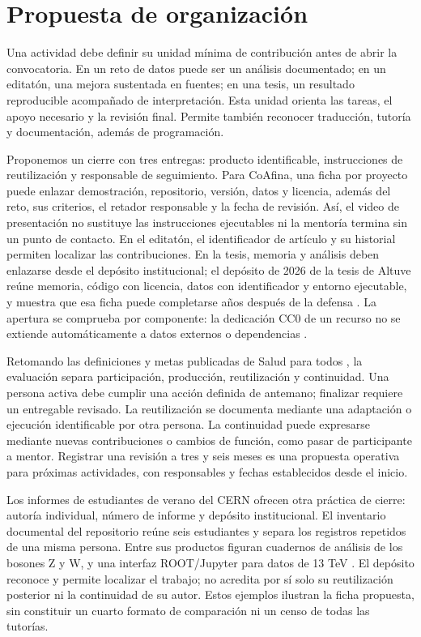\section{Propuesta de organización}
Una actividad debe definir su unidad mínima de contribución antes de abrir la convocatoria. En un reto de datos puede ser un análisis documentado; en un editatón, una mejora sustentada en fuentes; en una tesis, un resultado reproducible acompañado de interpretación. Esta unidad orienta las tareas, el apoyo necesario y la revisión final. Permite también reconocer traducción, tutoría y documentación, además de programación.

Proponemos un cierre con tres entregas: producto identificable, instrucciones de reutilización y responsable de seguimiento. Para CoAfina, una ficha por proyecto puede enlazar demostración, repositorio, versión, datos y licencia, además del reto, sus criterios, el retador responsable y la fecha de revisión. Así, el video de presentación no sustituye las instrucciones ejecutables ni la mentoría termina sin un punto de contacto. En el editatón, el identificador de artículo y su historial permiten localizar las contribuciones. En la tesis, memoria y análisis deben enlazarse desde el depósito institucional; el depósito de 2026 de la tesis de Altuve reúne memoria, código con licencia, datos con identificador y entorno ejecutable, y muestra que esa ficha puede completarse años después de la defensa \cite{tesisaltuve}. La apertura se comprueba por componente: la dedicación CC0 de un recurso no se extiende automáticamente a datos externos o dependencias \cite{cc0}.

Retomando las definiciones y metas publicadas de Salud para todos \cite{salud}, la evaluación separa participación, producción, reutilización y continuidad. Una persona activa debe cumplir una acción definida de antemano; finalizar requiere un entregable revisado. La reutilización se documenta mediante una adaptación o ejecución identificable por otra persona. La continuidad puede expresarse mediante nuevas contribuciones o cambios de función, como pasar de participante a mentor. Registrar una revisión a tres y seis meses es una propuesta operativa para próximas actividades, con responsables y fechas establecidos desde el inicio.

Los informes de estudiantes de verano del CERN ofrecen otra práctica de cierre: autoría individual, número de informe y depósito institucional. El inventario documental del repositorio reúne seis estudiantes y separa los registros repetidos de una misma persona. Entre sus productos figuran cuadernos de análisis de los bosones Z y W, y una interfaz ROOT/Jupyter para datos de 13 TeV \cite{banda,abah,wang}. El depósito reconoce y permite localizar el trabajo; no acredita por sí solo su reutilización posterior ni la continuidad de su autor. Estos ejemplos ilustran la ficha propuesta, sin constituir un cuarto formato de comparación ni un censo de todas las tutorías.
